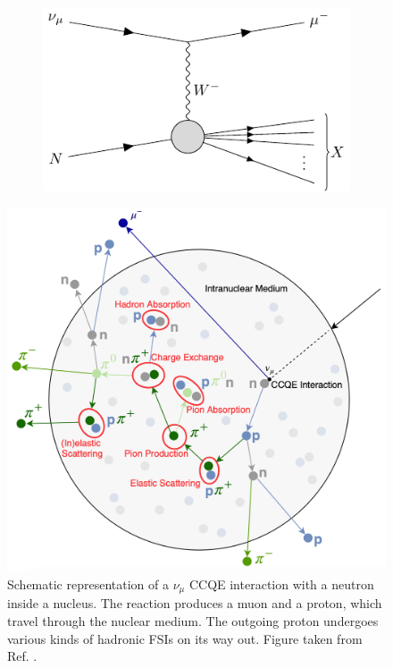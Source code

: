 \begin{figure}[t]
\begin{subfigure}{0.5\textwidth}
		\centering
		\includegraphics[width=.90\linewidth]{Images//Nu/feynman_ccdis.pdf}
	\end{subfigure}
	\caption{}
	\label{fig:neutrino_cc_interactions}
\end{figure}

\begin{figure}[t]
	\centering
	\includegraphics[width=.55\linewidth]{Images/Nu/lars_fsi.png}
	\caption[Schematic representation of a $\nu_{\mu}$ CCQE interaction with a neutron inside a nucleus.]{Schematic representation of a $\nu_{\mu}$ CCQE interaction with a neutron inside a nucleus. The reaction produces a muon and a proton, which travel through the nuclear medium. The outgoing proton undergoes various kinds of hadronic FSIs on its way out. Figure taken from Ref. \cite{Bathe-Peters2022}.}
	\label{fig:fsi_diagram}
\end{figure}